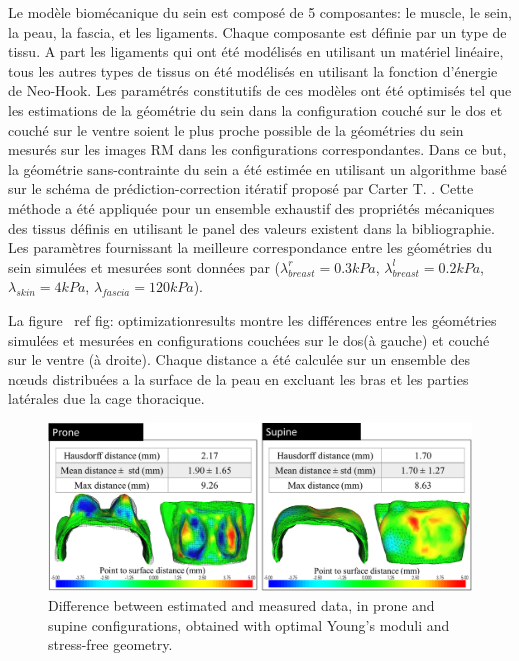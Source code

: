 Le modèle biomécanique du sein est composé de 5 composantes: le muscle, le sein, la peau, la fascia, et les ligaments. Chaque composante est définie par un type de tissu. A part les ligaments qui ont été modélisés en utilisant un matériel linéaire, tous les autres types de tissus on été modélisés en utilisant la fonction d'énergie de Neo-Hook. Les paramétrés constitutifs de ces modèles ont été optimisés tel que les estimations de la géométrie du sein dans la configuration couché sur le dos et couché sur le ventre soient le plus proche possible de la géométries du sein mesurés sur les images RM dans les configurations correspondantes. Dans ce but, la géométrie sans-contrainte du sein a été estimée en utilisant un algorithme basé sur le schéma de prédiction-correction itératif proposé par Carter T. \cite{carter_biomechanical_2009}. Cette méthode a été appliquée pour un ensemble exhaustif des propriétés mécaniques des tissus définis en utilisant le panel des valeurs existent dans la bibliographie. Les paramètres fournissant la meilleure correspondance entre les géométries du sein simulées et mesurées sont données par ($\lambda_{breast}^r=0.3 kPa$, $\lambda_{breast}^l=0.2 kPa$, $\lambda_{skin}=4 kPa$, $\lambda_{fascia}=120 kPa$).


La figure \ ref {fig: optimizationresults} montre les différences entre les géométries simulées et mesurées en configurations couchées sur le dos(à gauche) et couché sur le ventre (à droite). Chaque distance a été calculée sur un ensemble des nœuds distribuées a la surface de la peau en excluant les bras et les parties latérales due la cage thoracique.

\begin{figure}[!h]
\centering
\includegraphics[width=\textwidth,keepaspectratio]{figures/optimizationresults.png} 
\caption{Difference  between estimated and measured data, in prone and supine configurations, obtained with optimal Young's moduli and stress-free geometry. }\label{fig:geometryoptimizationresults}
\end{figure}


